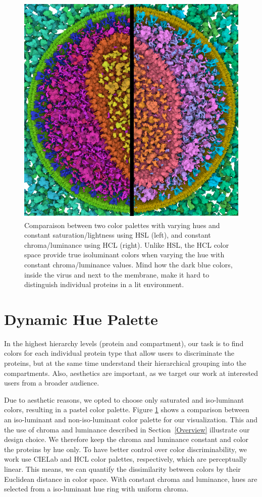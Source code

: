 \documentclass[review,journal]{vgtc}         %
\begin{document}
	
	\begin{figure}
		\centering
		\includegraphics[width=0.75\linewidth]{Figures/hslvshcl}
		\caption{Comparaison between two color palettes with varying hues and constant saturation/lightness using HSL (left), and constant chroma/luminance using HCL (right). 
		Unlike HSL, the HCL color space provide true isoluminant colors when varying the hue with constant chroma/luminance values.
		 Mind how the dark blue colors, inside the virus and next to the membrane, make it hard to distinguish individual proteins in a lit environment.}
		\label{fig:hslvshcl}
	\end{figure}
	
	
	
	\section{Dynamic Hue Palette}
	\label{sec:hue}
	
	In the highest hierarchy levels (protein and compartment), our task is to find colors for each individual protein type that allow users to discriminate the proteins, but at the same time understand their hierarchical grouping into the compartments. 
	Also, aesthetics are important, as we target our work at interested users from a broader audience. 
	
	Due to aesthetic reasons, we opted to choose only saturated and iso-luminant colors, resulting in a pastel color palette. 
	Figure \ref{fig:hslvshcl} shows a comparison between an iso-luminant and non-iso-luminant color palette for our visualization. This and the use of chroma and luminance described in Section~\ref{Overview} illustrate our design choice. 
	We therefore keep the chroma and luminance constant and color the proteins by hue only. 
	To have better control over color discriminability, we work use CIELab and HCL color palettes, respectively, which are perceptually linear. 
	This means, we can quantify the dissimilarity between colors by their Euclidean distance in color space. 
	With constant chroma and luminance, hues are selected from a iso-luminant hue ring with uniform chroma. 
	
\end{document}
